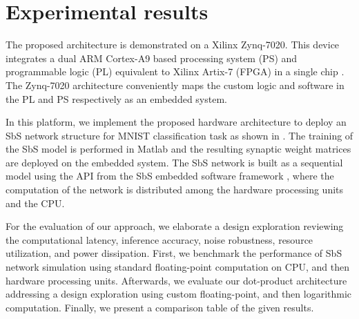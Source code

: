 \section{Experimental results} \label{sec:exp}
The proposed architecture is demonstrated on a Xilinx Zynq-7020. This device integrates a dual ARM Cortex-A9 based processing system (PS) and programmable logic (PL) equivalent to Xilinx Artix-7 (FPGA) in a single chip \cite{xilinx2015zynq}. The Zynq-7020 architecture conveniently maps the custom logic and software in the PL and PS respectively as an embedded system.

In this platform, we implement the proposed hardware architecture to deploy an SbS network structure for MNIST classification task as shown in . The training of the SbS model is performed in Matlab and the resulting synaptic weight matrices are deployed on the embedded system. The SbS network is built as a sequential model using the API from the SbS embedded software framework \cite{nevarez2020accelerator}, where the computation of the network is distributed among the hardware processing units and the CPU.

For the evaluation of our approach, we elaborate a design exploration reviewing the computational latency, inference accuracy, noise robustness, resource utilization, and power dissipation. First, we benchmark the performance of SbS network simulation using standard floating-point computation on CPU, and then hardware processing units. Afterwards, we evaluate our dot-product architecture addressing a design exploration using custom floating-point, and then logarithmic computation. Finally, we present a comparison table of the given results.

